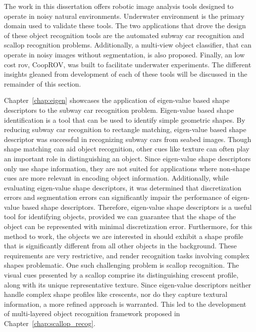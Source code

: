\documentclass {udthesis}
\begin{document}

The work in this dissertation offers robotic image analysis tools designed to operate in noisy natural environments. 
Underwater environment is the primary domain used to validate these tools.
The two applications that drove the design of these object recognition tools are the automated subway car recognition and scallop recognition problems.
Additionally, a multi-view object classifier, that can operate in noisy images without segmentation, is also proposed.
Finally, an low cost \gls{rov}, CoopROV, was built to facilitate underwater experiments. The different insights gleaned from development of each of these tools will be discussed in the remainder of this section.

Chapter~\ref{chap:eigen} showcases the application of eigen-value based shape descriptors to the subway car recognition problem. 
Eigen-value based shape identification is a tool that can be used to identify simple geometric shapes. 
By reducing subway car recognition to rectangle matching, eigen-value based shape descriptor was
successful in recognizing subway cars from seabed images.
Though shape matching can aid object recognition, other cues like texture can often play an important role
in distinguishing an object. Since eigen-value shape descriptors only use shape information, 
they are not suited for applications where non-shape cues are more relevant in encoding object information. 
Additionally, while evaluating eigen-value shape descriptors, it was determined that 
discretization errors and segmentation errors can significantly impair the performance of eigen-value based shape descriptors.
Therefore, eigen-value shape descriptors is a useful tool for identifying
objects, provided we can guarantee that the shape of the object can be represented with minimal discretization error. 
Furthermore, for this method to work, the objects
we are interested in should exhibit a shape profile that is significantly different from
all other objects in the background. These requirements are very restrictive, and render recognition tasks involving 
complex shapes problematic. One such challenging problem is scallop recognition.
The visual cues presented by a scallop comprise its distinguishing crescent profile, along with its unique representative texture.
Since eigen-value descriptors neither handle complex shape profiles like crescents, nor do they capture textural information,
a more refined approach is warranted.
This led to the development of multi-layered object recognition framework proposed in Chapter~\ref{chap:scallop_recog}.
\end{document}
